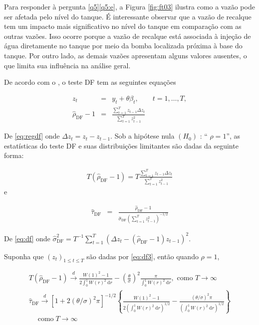 Para responder à pergunta \ref{q5}\ref{q5:e}, a Figura \ref{fig:ft03} ilustra como a vazão pode ser afetada pelo nível do tanque. É interessante observar que a vazão de recalque tem um impacto mais significativo no nível do tanque em comparação com as outras vazões. Isso ocorre porque a vazão de recalque está associada à injeção de água diretamente no tanque por meio da bomba localizada próxima à base do tanque. Por outro lado, as demais vazões apresentam alguns valores ausentes, o que limita sua influência na análise geral.	
	


De acordo com o , o teste DF tem as seguintes equações

\begin{eqnarray}
	z_t&=& y_t+\theta \beta_t, \qquad t=1,\ldots, T, \label{eq:df3}\\	
	\hat{\rho}_{\mathrm{DF}}-1&=&\frac{\sum_{t=1}^T z_{t-1} \Delta z_t}{\sum_{t=1}^T z_{t-1}^2} \label{eq:regdf}
\end{eqnarray}

De \eqref{eq:regdf} onde $\Delta z_t=z_t-z_{t-1}$. Sob a hipótese nula $\left(H_0\right)$ : `` $\rho=1$'', as estatísticas do teste DF e suas distribuições limitantes são dadas da seguinte forma:


\begin{eqnarray}
	T\left(\hat{\rho}_{\mathrm{DF}}-1\right)=T \frac{\sum_{t=1}^T z_{t-1} \Delta z_t}{\sum_{t=1}^T z_{t-1}^2}
\end{eqnarray}
e


\begin{eqnarray}
	\hat{\tau}_{\mathrm{DF}}&=&\frac{\hat{\rho}_{\mathrm{DF}}-1}{\hat{\sigma}_{\mathrm{DF}}\left(\sum_{t=1}^T z_{t-1}^2\right)^{-1 / 2}} \label{eq:df}
\end{eqnarray}

De \eqref{eq:df} onde $\hat{\sigma}_{\mathrm{DF}}^2=T^{-1} \sum_{t=1}^T\left(\Delta z_t-\left(\hat{\rho}_{\mathrm{DF}}-1\right) z_{t-1}\right)^2 .$



Suponha que $\left(z_t\right)_{1 \leq t \leq T}$ são dadas por \eqref{eq:df3}, então quando $\rho=1$,


\begin{eqnarray}
	T\left(\hat{\rho}_{\mathrm{DF}}-1\right) \stackrel{d}{\longrightarrow} \frac{W(1)^2-1}{2 \int_0^1 W(r)^2 \mathrm{~d} r}-\left(\frac{\theta}{\sigma}\right)^2 \frac{\pi}{\int_0^1 W(r)^2 \mathrm{~d} r}, \text { como } T \rightarrow \infty \\
	\hat{\tau}_{\mathrm{DF}} \stackrel{d}{\longrightarrow}\left[1+2(\theta / \sigma)^2 \pi\right]^{-1 / 2}\left\{\frac{W(1)^2-1}{2\left(\int_0^1 W(r)^2 \mathrm{~d} r\right)^{1 / 2}}-\frac{(\theta / \sigma)^2 \pi}{\left(\int_0^1 W(r)^2 \mathrm{~d} r\right)^{1 / 2}}\right\} \\
	\quad \operatorname{como} T \rightarrow \infty\label{eq:df2}
\end{eqnarray}

